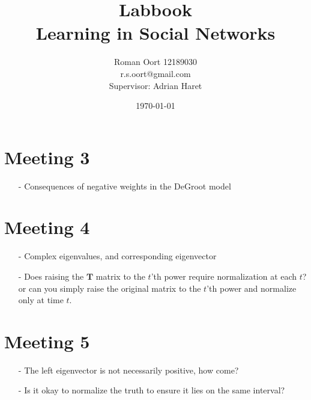 \documentclass{article}
\title{Labbook \\ Learning in Social Networks}
\author{Roman Oort 12189030\\ r.s.oort@gmail.com\\[1cm]{\normal Supervisor: Adrian Haret}}
\date{\today}
\begin{document}
\section{Meeting 3}
\begin{itemize}
    \item[-] Consequences of negative weights in the DeGroot model
\end{itemize}

\section{Meeting 4}
\begin{itemize}
    \item[-] Complex eigenvalues, and corresponding eigenvector
    \item[-] Does raising the $\textbf{T}$ matrix to the $t$'th power require normalization at each $t$? or can you simply raise the original matrix to the $t$'th power and normalize only at time $t$.
\end{itemize}

\section{Meeting 5}
\begin{itemize}
    \item[-] The left eigenvector is not necessarily positive, how come?
    \item[-] Is it okay to normalize the truth to ensure it lies on the same interval?
\end{itemize}
\end{document}
